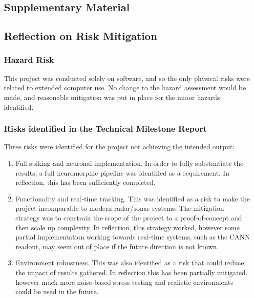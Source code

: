 \documentclass[12pt,a4paper]{report}
\begin{document}
\begin{appendices}

\chapter{Supplementary Material}
\label{ch:app_data}

\section{Reflection on Risk Mitigation}

\subsection{Hazard Risk}

This project was conducted solely on software, and so the only physical risks were related to extended computer use. No change to the hazard assessment would be made, and reasonable mitigation was put in place for the minor hazards identified.

\subsection{Risks identified in the Technical Milestone Report}

Three risks were identified for the project not achieving the intended output:
\begin{enumerate}
    \item Full spiking and neuronal implementation. In order to fully substantiate the results, a full neuromorphic pipeline was identified as a requirement. In reflection, this has been sufficiently completed.
    \item Functionality and real-time tracking. This was identified as a risk to make the project incomparable to modern radar/sonar systems. The mitigation strategy was to constrain the scope of the project to a proof-of-concept and then scale up complexity. In reflection, this strategy worked, however some partial implementation working towards real-time systems, such as the CANN readout, may seem out of place if the future direction is not known.
    \item Environment robustness. This was also identified as a risk that could reduce the impact of results gathered. In reflection this has been partially mitigated, however much more noise-based stress testing and realistic environments could be used in the future.
\end{enumerate}


\end{appendices}
\end{document}
